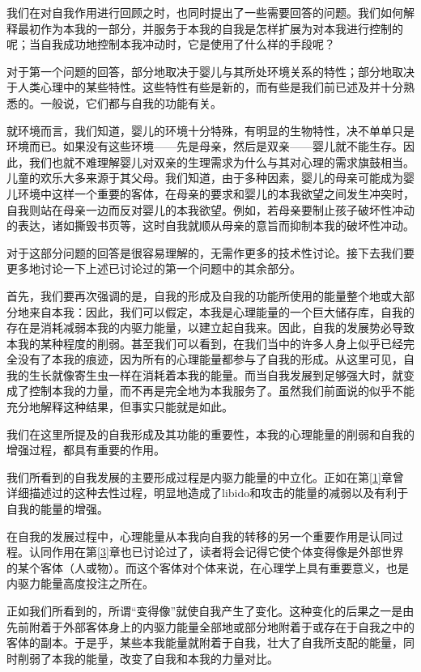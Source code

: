 \documentclass[UTF8,10pt,a4paper,openany]{book}
\begin{document}
我们在对自我作用进行回顾之时，也同时提出了一些需要回答的问题。我们如何解释最初作为本我的一部分，并服务于本我的自我是怎样扩展为对本我进行控制的呢；当自我成功地控制本我冲动时，它是使用了什么样的手段呢？\label{label1}

对于第一个问题的回答，部分地取决于婴儿与其所处环境关系的特性；部分地取决于人类心理中的某些特性。这些特性有些是新的，而有些是我们前已述及并十分熟悉的。一般说，它们都与自我的功能有关。

就环境而言，我们知道，婴儿的环境十分特殊，有明显的生物特性，决不单单只是环境而已。如果没有这些环境——先是母亲，然后是双亲——婴儿就不能生存。因此，我们也就不难理解婴儿对双亲的生理需求为什么与其对心理的需求旗鼓相当。儿童的欢乐大多来源于其父母。我们知道，由于多种因素，婴儿的母亲可能成为婴儿环境中这样一个重要的客体，在母亲的要求和婴儿的本我欲望之间发生冲突时，自我则站在母亲一边而反对婴儿的本我欲望。例如，若母亲要制止孩子破坏性冲动的表达，诸如撕毁书页等，这时自我就顺从母亲的意旨而抑制本我的破坏性冲动。

对于这部分问题的回答是很容易理解的，无需作更多的技术性讨论。接下去我们要更多地讨论一下上述已讨论过的第一个问题中的其余部分。

首先，我们要再次强调的是，自我的形成及自我的功能所使用的能量整个地或大部分地来自本我：因此，我们可以假定，本我是心理能量的一个巨大储存库，自我的存在是消耗减弱本我的内驱力能量，以建立起自我来。因此，自我的发展势必导致本我的某种程度的削弱。甚至我们可以看到，在我们当中的许多人身上似乎已经完全没有了本我的痕迹，因为所有的心理能量都参与了自我的形成。从这里可见，自我的生长就像寄生虫一样在消耗着本我的能量。而当自我发展到足够强大时，就变成了控制本我的力量，而不再是完全地为本我服务了。虽然我们前面说的似乎不能充分地解释这种结果，但事实只能就是如此。

我们在这里所提及的自我形成及其功能的重要性，本我的心理能量的削弱和自我的增强过程，都具有重要的作用。

我们所看到的自我发展的主要形成过程是内驱力能量的中立化。正如在第\ref{1}章曾详细描述过的这种去性过程，明显地造成了libido和攻击的能量的减弱以及有利于自我的能量的增强。

在自我的发展过程中，心理能量从本我向自我的转移的另一个重要作用是认同过程。认同作用在第\ref{3}章也已讨论过了，读者将会记得它使个体变得像是外部世界的某个客体（人或物）。而这个客体对个体来说，在心理学上具有重要意义，也是内驱力能量高度投注之所在。

正如我们所看到的，所谓“变得像”就使自我产生了变化。这种变化的后果之一是由先前附着于外部客体身上的内驱力能量全部地或部分地附着于或存在于自我之中的客体的副本。于是乎，某些本我能量就附着于自我，壮大了自我所支配的能量，同时削弱了本我的能量，改变了自我和本我的力量对比。
\end{document}
